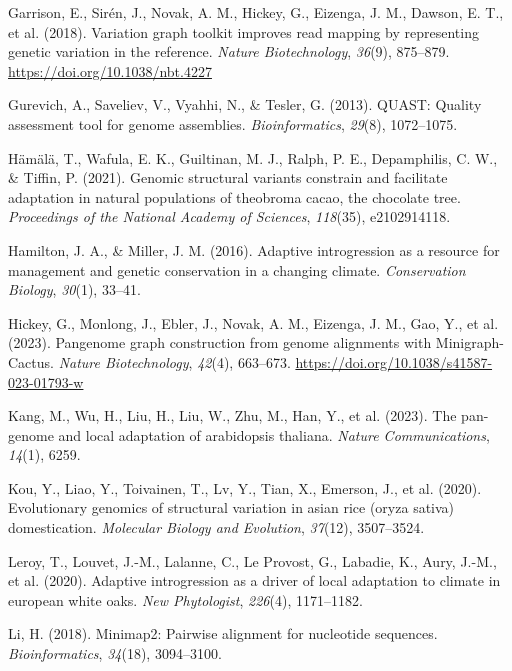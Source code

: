 \documentclass[
]{agujournal2019}
\newlength{\cslhangindent}
\newenvironment{CSLReferences}[2] %
 {\begin{list}{}{%
  \setlength{\itemindent}{0pt}
  \setlength{\leftmargin}{0pt}
  \setlength{\parsep}{0pt}
  \ifodd #1
   \setlength{\leftmargin}{\cslhangindent}
   \setlength{\itemindent}{-1\cslhangindent}
  \fi
  \setlength{\itemsep}{#2\baselineskip}}}
 {\end{list}}
\begin{document}
\begin{CSLReferences}{1}{0}
Garrison, E., Sirén, J., Novak, A. M., Hickey, G., Eizenga, J. M.,
Dawson, E. T., et al. (2018). Variation graph toolkit improves read
mapping by representing genetic variation in the reference. \emph{Nature
Biotechnology}, \emph{36}(9), 875--879.
\url{https://doi.org/10.1038/nbt.4227}

Gurevich, A., Saveliev, V., Vyahhi, N., \& Tesler, G. (2013). QUAST:
Quality assessment tool for genome assemblies. \emph{Bioinformatics},
\emph{29}(8), 1072--1075.

Hämälä, T., Wafula, E. K., Guiltinan, M. J., Ralph, P. E., Depamphilis,
C. W., \& Tiffin, P. (2021). Genomic structural variants constrain and
facilitate adaptation in natural populations of theobroma cacao, the
chocolate tree. \emph{Proceedings of the National Academy of Sciences},
\emph{118}(35), e2102914118.

Hamilton, J. A., \& Miller, J. M. (2016). Adaptive introgression as a
resource for management and genetic conservation in a changing climate.
\emph{Conservation Biology}, \emph{30}(1), 33--41.

Hickey, G., Monlong, J., Ebler, J., Novak, A. M., Eizenga, J. M., Gao,
Y., et al. (2023). Pangenome graph construction from genome alignments
with Minigraph-Cactus. \emph{Nature Biotechnology}, \emph{42}(4),
663--673. \url{https://doi.org/10.1038/s41587-023-01793-w}

Kang, M., Wu, H., Liu, H., Liu, W., Zhu, M., Han, Y., et al. (2023). The
pan-genome and local adaptation of arabidopsis thaliana. \emph{Nature
Communications}, \emph{14}(1), 6259.

Kou, Y., Liao, Y., Toivainen, T., Lv, Y., Tian, X., Emerson, J., et al.
(2020). Evolutionary genomics of structural variation in asian rice
(oryza sativa) domestication. \emph{Molecular Biology and Evolution},
\emph{37}(12), 3507--3524.

Leroy, T., Louvet, J.-M., Lalanne, C., Le Provost, G., Labadie, K.,
Aury, J.-M., et al. (2020). Adaptive introgression as a driver of local
adaptation to climate in european white oaks. \emph{New Phytologist},
\emph{226}(4), 1171--1182.

Li, H. (2018). Minimap2: Pairwise alignment for nucleotide sequences.
\emph{Bioinformatics}, \emph{34}(18), 3094--3100.


\end{CSLReferences}
\end{document}
